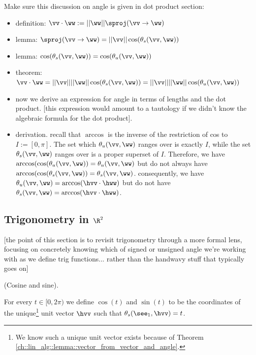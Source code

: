 Make sure this discussion on angle is given in dot product section:
\begin{itemize}
    \item definition: $\vv \cdot \ww := ||\ww|| \sproj(\vv \rightarrow \ww)$
    \item lemma: $\sproj(\vv \rightarrow \ww) = ||\vv|| \cos(\theta_s(\vv, \ww))$
    \item lemma: $\cos(\theta_s(\vv, \ww)) = \cos(\theta_u(\vv, \ww))$
    \item theorem: $\vv \cdot \ww = ||\vv|| ||\ww|| \cos(\theta_s(\vv, \ww)) = ||\vv|| ||\ww|| \cos(\theta_u(\vv, \ww))$
    \item now we derive an expression for angle in terms of lengths and the dot product. [this expression would amount to a tautology if we didn't know the algebraic formula for the dot product].
    \item derivation. recall that $\arccos$ is the inverse of the restriction of cos to $I := [0, \pi]$. The set which $\theta_u(\vv, \ww)$ ranges over is exactly $I$, while the set $\theta_s(\vv, \ww)$ ranges over is a proper superset of $I$. Therefore, we have $\arccos(\cos(\theta_u(\vv, \ww)) = \theta_u(\vv, \ww)$ but do not always have $\arccos(\cos(\theta_s(\vv, \ww)) = \theta_s(\vv, \ww)$. consequently, we have $\theta_u(\vv, \ww) = \arccos(\hvv \cdot \hww)$ but do not have $\theta_s(\vv, \ww) = \arccos(\hvv \cdot \hww)$.
\end{itemize}

\subsection*{Trigonometry in $\R^2$}

[the point of this section is to revisit trigonometry through a more formal lens, focusing on concretely knowing which of signed or unsigned angle we're working with as we define trig functions... rather than the handwavy stuff that typically goes on]

\begin{defn}
	\label{ch::lin_alg::deriv::cosine_sine}
	(Cosine and sine).
	
	For every $t \in [0, 2\pi)$ we define $\cos(t)$ and $\sin(t)$ to be the coordinates of the unique\footnote{We know such a unique unit vector exists because of Theorem \ref{ch::lin_alg::lemma::vector_from_vector_and_angle}.} unit vector $\hvv$ such that $\theta_s(\see_1, \hvv) = t$.
\end{defn}

